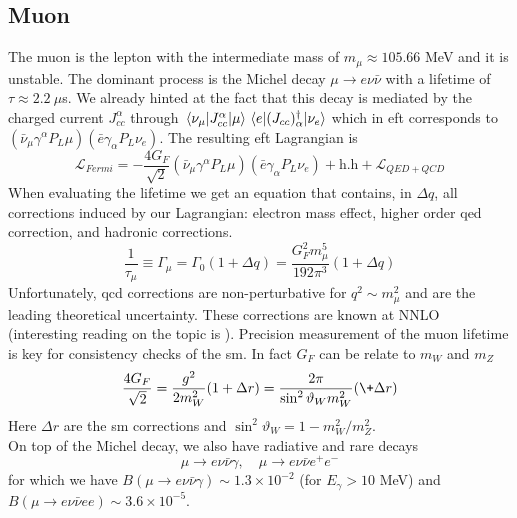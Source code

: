 \begin{refsection}
    \subsection{Muon}
        The muon is the lepton with the intermediate mass of $m_\mu \approx 105.66$ MeV and it is unstable. The dominant process is the Michel decay $\mu\rightarrow e\nu\bar{\nu}$ with a lifetime of $\tau\approx2.2\ \mu$s. We already hinted at the fact that this decay is mediated by the charged current $J_{cc}^\alpha$ through $\matrixel{\nu_\mu}{J_{cc}^\alpha}{\mu}\matrixel{e}{(J_{cc})^\dag_\alpha}{\nu_e}$ which in \gls{eft} corresponds to $(\bar{\nu}_\mu\gamma^\alpha P_L\mu)(\bar{e}\gamma_\alpha P_L\nu_e)$. The resulting \gls{eft} Lagrangian is
        \begin{equation}
            \mathcal{L}_{Fermi}=-\frac{4G_F}{\sqrt{2}} (\bar{\nu}_\mu\gamma^\alpha P_L\mu)(\bar{e}\gamma_\alpha P_L\nu_e) + \text{h.h}+ \mathcal{L}_{QED+QCD}
        \end{equation}
        When evaluating the lifetime we get an equation that contains, in $\Delta q$, all corrections induced by our Lagrangian: electron mass effect, higher order \gls{qed} correction, and hadronic corrections. 
        \begin{equation}
            \frac{1}{\tau_\mu}\equiv\Gamma_\mu = \Gamma_0(1+\Delta q) = \frac{G_F^2 m_\mu^5}{192 \pi^3}(1+\Delta q)
            \label{eq:tau}
        \end{equation}
        Unfortunately, \gls{qcd} corrections are non-perturbative for $q^2\sim m_\mu^2$ and are the leading theoretical uncertainty. These corrections are known at NNLO (interesting reading on the topic is \cite{Gurgone}).
        Precision measurement of the muon lifetime is key for consistency checks of the \gls{sm}. In fact $G_F$ can be relate to $m_W$ and $m_Z$
        \begin{equation}
            \frac{4G_F}{\sqrt{2}}=\frac{g^2}{2m_W^2}(1+\Delta r)=\frac{2\pi}{\sin^2\vartheta_Wm_W^2}(\+\Delta r)
        \end{equation}
        Here $\Delta r$ are the \gls{sm} corrections and $\sin^2\vartheta_W=1-m_W^2/m_Z^2$.\\
        On top of the Michel decay, we also have radiative and rare decays
        \begin{equation}
            \mu\rightarrow e\nu\bar{\nu}\gamma, \quad \mu\rightarrow e\nu\bar{\nu}e^+e^-
        \end{equation}
        for which we have $B(\mu\rightarrow e\nu\bar{\nu}\gamma)\sim 1.3\times 10^{-2}$ (for $E_\gamma>10$ MeV) and $B(\mu\rightarrow e\nu\bar{\nu}ee)\sim 3.6 \times 10^{-5}$.

\end{refsection}
